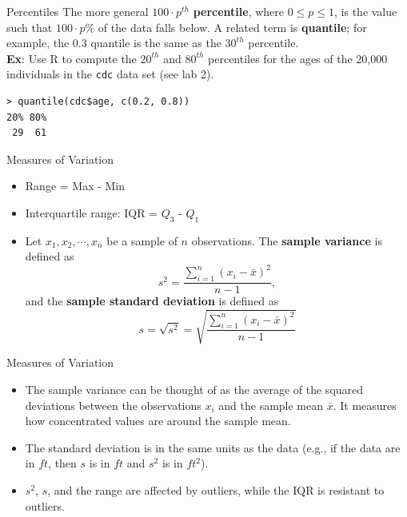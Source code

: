 \documentclass{beamer}
\begin{document}
\begin{frame}[fragile]{Percentiles}
The more general $100 \cdot p^{th}$ \textbf{percentile}, where $0 \leq p\leq 1$, is the value such that $100 \cdot p$\% of the data falls below.  A related term is \textbf{quantile}; for example, the 0.3 quantile is the same as the $30^{th}$ percentile.\\
\vspace{15pt}
\textbf{Ex}: Use R to compute the $20^{th}$ and $80^{th}$ percentiles for the ages of the 20,000 individuals in the \texttt{cdc} data set (see lab 2).
\begin{verbatim}
> quantile(cdc$age, c(0.2, 0.8))
20% 80% 
 29  61
\end{verbatim}
\end{frame}

\begin{frame}{Measures of Variation}
\begin{itemize}
\item Range = Max - Min
\vspace{10pt}
\item Interquartile range: IQR = $Q_3$ - $Q_1$
\vspace{10pt}
\item Let $x_1, x_2, \cdots, x_n$ be a sample of $n$ observations.  The \textbf{sample variance} is defined as
$$s^2 = \frac{\sum_{i=1}^n (x_i - \bar{x})^2}{n-1},$$
and the \textbf{sample standard deviation} is defined as
$$s = \sqrt{s^2} = \sqrt{\frac{\sum_{i=1}^n (x_i - \bar{x})^2}{n-1}}$$
\end{itemize}
\end{frame}

\begin{frame}{Measures of Variation}
\begin{itemize}
\item The sample variance can be thought of as the average of the squared deviations between the observations $x_i$ and the sample mean $\bar{x}$.  It measures how concentrated values are around the sample mean.
\vspace{5pt}
\item The standard deviation is in the same units as the data (e.g., if the data are in $ft$, then $s$ is in $ft$ and $s^2$ is in $ft^2$).
\vspace{5pt}
\item $s^2$, $s$, and the range are affected by outliers, while the IQR is resistant to outliers.
\end{itemize}
\end{frame}
\end{document}
